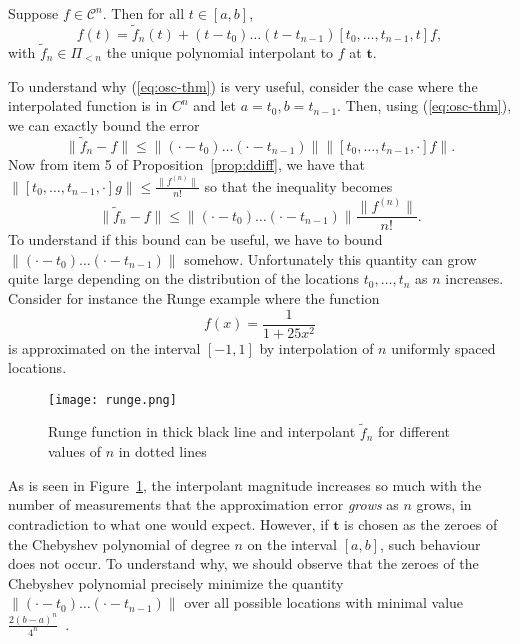 \begin{thm}
  Suppose $f \in \mathcal{C}^n$. Then for all $t \in [a,b]$,
  \begin{equation}
    \label{eq:osc-thm}
    f(t) = \tilde{f}_n(t) + (t-t_0)\ldots (t-t_{n-1})[t_0, \ldots, t_{n-1}, t]f,
  \end{equation}
  with $\tilde{f}_n \in \Pi_{<n}$ the unique polynomial interpolant to $f$ at $\bm{t}$.
\end{thm}

To understand why (\ref{eq:osc-thm}) is very useful, consider the case where the interpolated function is in $C^n$ and 
let $a=t_0, b=t_{n-1}$. Then, using (\ref{eq:osc-thm}), we can exactly bound the error
\begin{equation*}
  \|\tilde{f}_n - f\| \leq \|(\cdot - t_0)\ldots (\cdot - t_{n-1})\| \|[t_0, \ldots, t_{n-1}, \cdot]f\|.
\end{equation*}
Now from item 5 of Proposition~\ref{prop:ddiff}, we have that $\|[t_0, \ldots, t_{n-1}, \cdot]g\| \leq 
\frac{\|f^{(n)}\|}{n!}$ so that the inequality becomes
\begin{equation*}
  \|\tilde{f}_n - f\| \leq \|(\cdot - t_0)\ldots (\cdot - t_{n-1})\| \frac{\|f^{(n)}\|}{n!}.
\end{equation*}
To understand if this bound can be useful, we have to bound $\|(\cdot - t_0)\ldots (\cdot - t_{n-1})\|$ somehow.
Unfortunately this quantity can grow quite large depending on the distribution of the locations $t_0, \ldots, t_n$ as 
$n$ increases. Consider for instance the Runge example where the function 
\begin{equation*}
  f(x) = \frac{1}{1+25x^2}
\end{equation*}
is approximated on the interval $[-1,1]$ by interpolation of $n$ uniformly spaced locations.  \begin{figure}[!h]
  \centering
  \texttt{[image: runge.png]}
  \caption{Runge function in thick black line and interpolant $\tilde{f}_n$ for different values of $n$ in dotted 
  lines}\label{fig:runge}
\end{figure}
As is seen in Figure~\ref{fig:runge}, the interpolant magnitude increases so much with the number of measurements that 
the approximation error \emph{grows} as $n$ grows, in contradiction to what one would expect. However, if $\bm{t}$ is 
chosen as the zeroes of the Chebyshev polynomial of degree $n$ on the interval $[a,b]$, such behaviour does not occur.  
To understand why, we should observe that the zeroes of the Chebyshev polynomial precisely minimize the quantity 
$\|(\cdot - t_0)\ldots (\cdot - t_{n-1})\|$ over all possible locations with minimal value 
$\frac{2{(b-a)}^n}{4^n}$~\cite{de_boor_practical_2001}. \\

